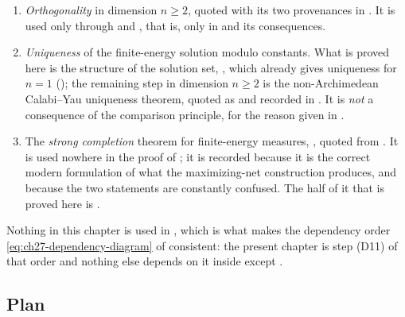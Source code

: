 \begin{enumerate}
\item[\textup{(I1)}]
\emph{Orthogonality} in dimension \(n\geq2\), quoted with its two
provenances in .  It is used only through
 and , that
is, only in  and its consequences.
\item[\textup{(I2)}]
\emph{Uniqueness} of the finite-energy solution modulo constants.  What is
proved here is the structure of the solution set,
, which already gives uniqueness for \(n=1\)
(); the remaining step in dimension
\(n\geq2\) is the non-Archimedean Calabi--Yau uniqueness theorem, quoted as
\cite[Proposition~8.2]{BFJ15} and recorded in
.  It is \emph{not} a consequence
of the comparison principle, for the reason given in
.
\item[\textup{(I3)}]
The \emph{strong completion} theorem for finite-energy measures,
, quoted from
\cite{BJ25FiniteEnergy}.  It is used nowhere in the proof of
; it is recorded because it is the correct modern
formulation of what the maximizing-net construction produces, and because
the two statements are constantly confused.  The half of it that is proved
here is .
\end{enumerate}

Nothing in this chapter is used in
,
which is what makes the dependency order
\eqref{eq:ch27-dependency-diagram} of  consistent:
the present chapter is step \textup{(D11)} of that order and nothing else
depends on it inside  except
.

\subsection{Plan}
\label{sec:ch28-plan}

